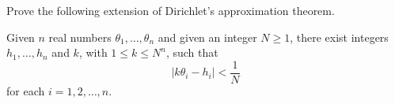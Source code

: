 Prove the following extension of Dirichlet's approximation theorem.

Given $n$ real numbers $\theta_1, \ldots, \theta_n$ and given an integer $N \geq 1$, there exist integers $h_1, \ldots, h_n$ and $k$, with $1 \leq k \leq N^n$, such that
$$|k\theta_i - h_i| < \frac{1}{N}$$
for each $i = 1, 2, \ldots, n$.
